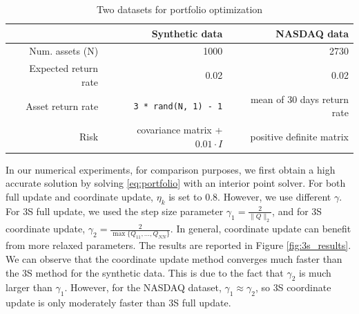 \begin{table}[htbp]
\centering
 \begin{tabular}{rrr}
  \toprule
    & Synthetic data  & NASDAQ data\\
   \midrule
   Num. assets (N) & 1000 & 2730 \\
   Expected return rate & 0.02 & 0.02 \\
   Asset return rate & \texttt{3 * rand(N, 1) - 1} & mean of 30 days return rate \\
   Risk & covariance matrix + $0.01\cdot I$ & positive definite matrix \\
   \bottomrule
\end{tabular}
 \caption{Two datasets for portfolio optimization \label{tab:3s-data}}
\end{table}

In our numerical experiments, for comparison purposes, we first obtain a high accurate solution by solving \eqref{eq:portfolio} with an interior point solver. For both full update and coordinate update, $\eta_k$ is set to 0.8. However, we use different $\gamma$. For 3S full update, we used the step size parameter $\gamma_1 = \frac{2}{\|Q\|_2}$, and for 3S coordinate update, $\gamma_2 = \frac{2}{\max\{Q_{11}, ..., Q_{NN}\}}$. In general, coordinate update can benefit from more relaxed parameters. The results are reported in Figure \ref{fig:3s_results}. We can observe that the coordinate update method converges much faster than the 3S method for the synthetic data. This is due to the fact that $\gamma_2$ is much larger than $\gamma_1$. However, for the NASDAQ dataset, $\gamma_1 \approx \gamma_2$, so 3S coordinate update is only moderately faster than 3S full update.

